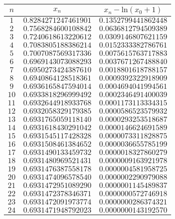 \documentclass{article}
\begin{document}
\begin{enumerate}
\begin{enumerate}
\begin{table}[H]
\centering
\begin{tabular}{ |c|c|c| }
\hline
$n$ & $x_n$ & $x_n - \mbox{ln}(x_0+1)$ \\
\hline
$1$ & $0.8284271247461901$ & $0.1352799441862448$ \\
 \hline
$2$ & $0.7568284600108842$ & $0.0636812794509389$ \\
 \hline
$3$ & $0.7240618613220612$ & $0.0309146807621159$ \\
 \hline
$4$ & $0.7083805188386214$ & $0.0152333382786761$ \\
 \hline
$5$ & $0.7007087569317336$ & $0.0075615763717883$ \\
 \hline
$6$ & $0.6969143073088293$ & $0.0037671267488840$ \\
 \hline
$7$ & $0.6950273424387610$ & $0.0018801618788157$ \\
 \hline
$8$ & $0.6940864128518361$ & $0.0009392322918909$ \\
 \hline
$9$ & $0.6936165847594014$ & $0.0004694041994561$ \\
 \hline
$10$ & $0.6933818296999492$ & $0.0002346491400039$ \\
 \hline
$11$ & $0.6932644918933768$ & $0.0001173113334315$ \\
 \hline
$12$ & $0.6932058329179385$ & $0.0000586523579932$ \\
 \hline
$13$ & $0.6931765059118140$ & $0.0000293253518687$ \\
 \hline
$14$ & $0.6931618430291042$ & $0.0000146624691589$ \\
 \hline
$15$ & $0.6931545117428328$ & $0.0000073311828875$ \\
 \hline
$16$ & $0.6931508461384652$ & $0.0000036655785199$ \\
 \hline
$17$ & $0.6931490133459732$ & $0.0000018327860279$ \\
 \hline
$18$ & $0.6931480969521431$ & $0.0000009163921978$ \\
 \hline
$19$ & $0.6931476387558178$ & $0.0000004581958725$ \\
 \hline
$20$ & $0.6931474096578540$ & $0.0000002290979088$ \\
 \hline
$21$ & $0.6931472951089290$ & $0.0000001145489837$ \\
 \hline
$22$ & $0.6931472378346371$ & $0.0000000572746918$ \\
 \hline
$23$ & $0.6931472091973774$ & $0.0000000286374321$ \\
 \hline
$24$ & $0.6931471948792023$ & $0.0000000143192570$ \\

\end{tabular}
\end{table}
\end{enumerate}
\end{enumerate}
\end{document}
